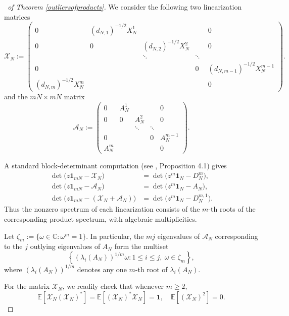 \documentclass[11pt,reqno]{amsart}
\theoremstyle{plain}
\theoremstyle{remark}
\numberwithin{equation}{section}
\begin{document}
\begin{proof}[\proofname\ of Theorem \ref{outliersofproducts}]



We consider the following two linearization matrices
$$
\mathcal{X}_N:=\begin{pmatrix}
    0&(d_{N,1})^{-1/2}X_N^1&\quad&\quad& 0\\
    0&0&(d_{N,2})^{-1/2}X_N^2 &\quad&0\\
    \quad&\quad&\ddots&\ddots&\quad\\
    0&\quad&\quad&0&(d_{N,m-1})^{-1/2}X_N^{m-1}\\(d_{N,m})^{-1/2}X_N^m&\quad&\quad&\quad& 0
\end{pmatrix}.
$$
and the $mN\times mN$ matrix
$$
\mathcal{A}_N:=\begin{pmatrix}
    0&A_N^1&&& 0\\
    0&0&A_N^2 &&0\\
    &&\ddots&\ddots&\\
    0&&&0&A_N^{m-1}\\A_N^m&&&& 0
\end{pmatrix}.
$$


A standard block-determinant computation (see \cite{coston2020outliers}, Proposition 4.1) gives
\[
\begin{aligned}
\det\bigl(z\mathbf{1}_{mN}-\mathcal{X}_N\bigr)
 &=\det\bigl(z^m\mathbf{1}_N-D_N^m\bigr),\\
\det\bigl(z\mathbf{1}_{mN}-\mathcal{A}_N\bigr)
 &=\det\bigl(z^m\mathbf{1}_N-A_N\bigr),\\
\det\bigl(z\mathbf{1}_{mN}-(\mathcal{X}_N+\mathcal{A}_N)\bigr)
 &=\det\bigl(z^m\mathbf{1}_N-D_N^{m,1}\bigr).
\end{aligned}
\]
Thus the nonzero spectrum of each linearization consists of the $m$-th roots of the corresponding product spectrum, with algebraic multiplicities.

Let $\zeta_m:=\{\omega\in\mathbb{C}:\omega^m=1\}$. In particular, the $mj$ eigenvalues of $\mathcal{A}_N$ corresponding to the $j$ outlying eigenvalues of $A_N$ form the multiset
\[
\left\{(\lambda_i(A_N))^{1/m}\omega:1\leq i\leq j,\ \omega\in\zeta_m\right\},
\]
where $(\lambda_i(A_N))^{1/m}$ denotes any one $m$-th root of $\lambda_i(A_N)$.

For the matrix $\mathcal{X}_N$, we readily check that whenever $m\geq 2$, $$\mathbb{E}[\mathcal{X}_N(\mathcal{X}_N)^*]=\mathbb{E}[(\mathcal{X}_N)^*\mathcal{X}_N]=\mathbf{1},\quad \mathbb{E}[(\mathcal{X}_N)^2]=0.$$ 


\end{proof}
\end{document}

